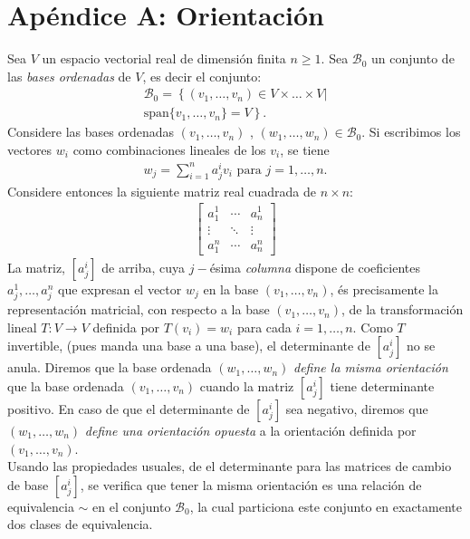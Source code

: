 \documentclass[oneside,11pt]{memoir}
\begin{document}
\chapter*{Apéndice A: Orientación}
Sea $V$ un espacio vectorial real de dimensión finita $n\geq 1$. Sea $\mathcal{B}_0$ un conjunto de las \textit{bases ordenadas} de $V$, es decir el conjunto:
\begin{align*}
\mathcal{B}_0=\left\{(v_1,\ldots,v_n)\in V\times \ldots\times V|\right.\\
   \left. \text{span}\{v_1,\ldots,v_n\}=V \right\}.
\end{align*}
Considere las bases ordenadas $(v_1,\ldots,v_n)$ , $(w_1,\ldots,w_n)\in \mathcal{B}_0$. Si escribimos los vectores $w_i$ como combinaciones lineales de los $v_i$, se tiene
\begin{align*}
    w_j=\sum_{i=1}^na^i_jv_i \text{ para }j=1,\ldots,n.
\end{align*}
Considere entonces la siguiente matriz real cuadrada de $n\times n$:
\begin{align*}
    \begin{bmatrix}
        a_1^1&\cdots &a_n^1\\
        \vdots&\ddots&\vdots\\
        a_1^n&\cdots &a_n^n
    \end{bmatrix}
\end{align*}
La matriz, $[a_j^i]$ de arriba, cuya $j-$ésima \textit{columna} dispone de coeficientes $a_j^1,\ldots, a_j^n$ que expresan el vector $w_j$ en la base $(v_1,\ldots, v_n)$, és precisamente la representación matricial, con respecto a la base $(v_1,\ldots,v_n)$, de la transformación lineal $T:V\to V$ definida por $T(v_i)=w_i$ para cada $i=1,\ldots,n$. Como $T$ invertible, (pues manda una base a una base), el determinante de $[a_j^i]$ no se anula.
Diremos que la base ordenada $(w_1,\ldots,w_n)$ \textit{define la misma orientación} que la base ordenada $(v_1,\ldots,v_n)$ cuando la matriz $[a_j^i]$ tiene determinante positivo. En caso de que el determinante de $[a_j^i]$ sea negativo, diremos que $(w_1,\ldots,w_n)$ \textit{define una orientación opuesta} a la orientación definida por $(v_1,\ldots,v_n)$.\\

Usando las propiedades usuales, de el determinante para las matrices de cambio de base $[a_j^i]$, se verifica que tener la misma orientación es una relación de equivalencia $\sim $ en el conjunto $\mathcal{B}_0$, la cual particiona este conjunto en exactamente dos clases de equivalencia.\\
\end{document}
